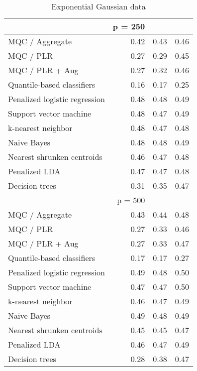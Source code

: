 \begin{table}[p]
\begin{minipage}{0.49\textwidth}
{\begin{tabular}{lrrr}
        \hline
        & p = 250 \\
        \hline

        MQC / Aggregate & 0.42 & 0.43 & 0.46 \\ 
        MQC / PLR & 0.27 & 0.29 & 0.45 \\ 
        MQC / PLR + Aug & 0.27 & 0.32 & 0.46 \\ 
        Quantile-based classifiers & 0.16 & 0.17 & 0.25 \\ 
        Penalized logistic regression & 0.48 & 0.48 & 0.49 \\ 
        Support vector machine & 0.48 & 0.47 & 0.49 \\ 
        k-nearest neighbor & 0.48 & 0.47 & 0.48 \\ 
        Naive Bayes & 0.48 & 0.48 & 0.49 \\ 
        Nearest shrunken centroids & 0.46 & 0.47 & 0.48 \\ 
        Penalized LDA & 0.47 & 0.47 & 0.48 \\ 
        Decision trees & 0.31 & 0.35 & 0.47 \\[2ex]

        \hline
        & p = 500 \\
        \hline

        MQC / Aggregate & 0.43 & 0.44 & 0.48 \\ 
        MQC / PLR & 0.27 & 0.33 & 0.46 \\ 
        MQC / PLR + Aug & 0.27 & 0.33 & 0.47 \\ 
        Quantile-based classifiers & 0.17 & 0.17 & 0.27 \\ 
        Penalized logistic regression & 0.49 & 0.48 & 0.50 \\ 
        Support vector machine & 0.47 & 0.47 & 0.50 \\ 
        k-nearest neighbor & 0.46 & 0.47 & 0.49 \\ 
        Naive Bayes & 0.49 & 0.48 & 0.49 \\ 
        Nearest shrunken centroids & 0.45 & 0.45 & 0.47 \\ 
        Penalized LDA & 0.46 & 0.47 & 0.49 \\ 
        Decision trees & 0.28 & 0.38 & 0.47 \\ 
        \hline
      \end{tabular}
    }
  \end{minipage}

  \caption{Exponential Gaussian data}
  \label{tab:exponential-gauss}
\end{table}




